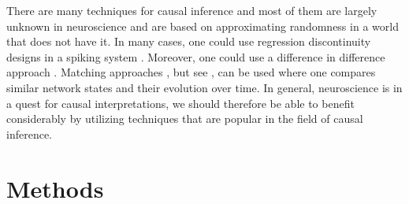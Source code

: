 \documentclass[11pt]{article}
\begin{document}
There are many techniques for causal inference and most of them are largely unknown in neuroscience and are based on approximating randomness in a world that does not have it. In many cases, one could use regression discontinuity designs in a spiking system \citep{BenPaper, imbens2008regression}. Moreover, one could use a difference in difference approach \citep{abadie2005semiparametric}. Matching approaches \citep{stuart2010matching}, but see \citep{king2016propensity}, can be used where one compares similar network states and their evolution over time. In general, neuroscience is in a quest for causal interpretations, we should therefore be able to benefit considerably by utilizing techniques that are popular in the field of causal inference.



\section{Methods}
\end{document}
